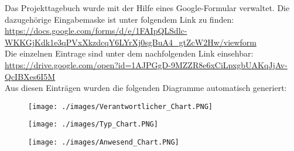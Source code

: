 Das Projekttagebuch wurde mit der Hilfe eines Google-Formular verwaltet. Die dazugehörige Eingabemaske ist unter folgendem Link zu finden: \url{https://docs.google.com/forms/d/e/1FAIpQLSdlc-WKKGjKdk1e3qPVxXkzdcqY6LYrXj0sgBuA4_gtZcW2Hw/viewform}\\
Die einzelnen Eintrage sind unter dem nachfolgenden Link einsehbar: \url{https://drive.google.com/open?id=1AJPGgD-9MZZR8e6xCiLpxgbUAKqJjAv-QcIBXes6I5M}\\
Aus diesen Einträgen wurden die folgenden Diagramme automatisch generiert:

\begin{figure}[H]
    \centering
    \texttt{[image: ./images/Verantwortlicher\_Chart.PNG]}
\end{figure}

\begin{figure}[H]
    \centering
    \texttt{[image: ./images/Typ\_Chart.PNG]}
\end{figure}

\begin{figure}[H]
    \centering
    \texttt{[image: ./images/Anwesend\_Chart.PNG]}
\end{figure}